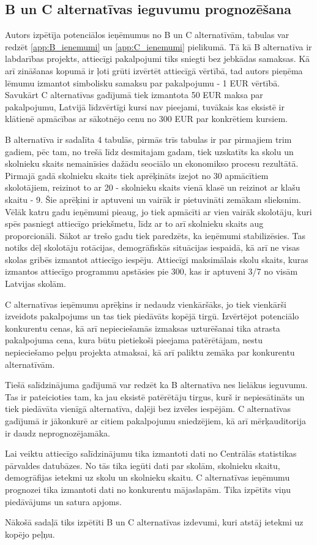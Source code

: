 \subsection{B un C alternatīvas ieguvumu prognozēšana}
Autors izpētīja potenciālos ieņēmumus no B un C alternatīvām, tabulas var redzēt \ref{app:B_ienemumi} un \ref{app:C_ienemumi} pielikumā.
Tā kā B alternatīva ir labdarības projekts, attiecīgi pakalpojumi tiks sniegti bez jebkādas samaksas. Kā arī zināšanas kopumā
ir ļoti grūti izvērtēt attiecīgā vērtībā, tad autors pieņēma lēmumu izmantot simbolisku samaksu par pakalpojumu - 1 EUR vērtībā.
Savukārt C alternatīvas gadījumā tiek izmantota 50 EUR maksa par pakalpojumu, Latvijā līdzvērtīgi kursi nav pieejami, tuvākais kas
eksistē ir klātienē apmācības ar sākotnējo cenu no 300 EUR par konkrētiem kursiem.
\par
B alternatīva ir sadalīta 4 tabulās, pirmās trīs tabulas ir par pirmajiem trim gadiem, pēc tam, no trešā līdz desmitajam gadam,
tiek uzskatīts ka skolu un skolnieku skaits nemainīsies dažādu seociālo un ekonomikso procesu rezultātā. Pirmajā gadā skolnieku skaits
tiek aprēķināts izejot no 30 apmācītiem skolotājiem, reizinot to ar 20 - skolnieku skaits vienā klasē un reizinot ar klašu skaitu - 9.
Šie aprēķini ir aptuveni un vairāk ir pietuvināti zemākam slieksnim. Vēlāk katru gadu ieņēmumi pieaug, jo tiek apmācīti ar vien vairāk
skolotāju, kuri spēs pasniegt attiecīgo priekšmetu, līdz ar to arī skolnieku skaits aug proporcionāli. Sākot ar trešo gadu tiek paredzēts,
ka ieņēmumi stabilizēsies. Tas notiks dēļ skolotāju rotācijas, demogrāfiskās situācijas iespaidā, kā arī ne visas skolas gribēs izmantot
attiecīgo iespēju. Attiecīgi maksimālais skolu skaits, kuras izmantos attiecīgo programmu apstāsies pie 300, kas ir aptuveni 3/7 no visām
Latvijas skolām.
\par
C alternatīvas ieņēmumu aprēķins ir nedaudz vienkāršāks, jo tiek vienkārši izveidots pakalpojums un tas tiek piedāvāts kopējā tirgū.
Izvērtējot potenciālo konkurentu cenas, kā arī nepieciešamās izmaksas uzturēšanai tika atrasta pakalpojuma cena, kura būtu pietiekoši
pieejama patērētājam, nestu nepieciešamo peļņu projekta atmaksai, kā arī paliktu zemāka par konkurentu alternatīvām.
\par
Tiešā salīdzinājuma gadījumā var redzēt ka B alternatīva nes lielākus ieguvumu. Tas ir pateicioties tam, ka jau eksistē patērētāju tirgus,
kurš ir nepiesātināts un tiek piedāvāta vienīgā alternatīva, daļēji bez izvēles iespējām. C alternatīvas gadījumā ir jākonkurē ar citiem
pakalpojumu sniedzējiem, kā arī mērķauditorija ir daudz neprognozējamāka.
\par
Lai veiktu attiecīgo salīdzinājumu tika izmantoti dati no Centrālās statistikas pārvaldes datubāzes. No tās tika iegūti dati par skolām,
skolnieku skaitu, demogrāfijas ietekmi uz skolu un skolnieku skaitu. C alternatīvas ieņēmumu prognozei tika izmantoti dati no konkurentu
mājaslapām. Tika izpētīts viņu piedāvājums un satura apjoms.  
\par
Nākošā sadaļā tiks izpētīti B un C alternatīvas izdevumi, kuri atstāj ietekmi uz kopējo peļņu.
